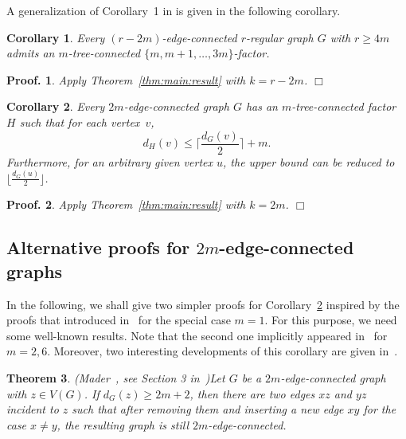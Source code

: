 \documentclass[10pt,bezier]{article}
\newtheorem{prethm}{{\bf Theorem}}[section]
\newenvironment{thm}{\begin{prethm}{\hspace{-0.5
em}{\bf.}}}{\end{prethm}}
\newtheorem{precor}[prethm]{{\bf Corollary}}
\newenvironment{cor}{\begin{precor}{\hspace{-0.5
em}{\bf.}}}{\end{precor}}
\newtheorem{preproof}{{\bf Proof.}}
\newenvironment{proof}[1]{\begin{preproof}{\rm
#1}\hfill{$\Box$}}{\end{preproof}}
\begin{document}
%
A generalization of Corollary~1 in \cite{SpanningTreeEulerian-2015} is given in the following corollary.
\begin{cor}
{ Every $(r-2m)$-edge-connected $r$-regular graph $G$ with $r\ge 4m$
 admits an $m$-tree-connected $\{m,m+1,\ldots,3m\}$-factor.
}\end{cor}
\begin{proof}
{Apply Theorem~\ref{thm:main:result} with $k=r-2m$.
}\end{proof}
%
\begin{cor}\label{cor:New}
{Every $2m$-edge-connected graph $G$ has an $m$-tree-connected factor $H$ 
such that for each vertex~$v$, 
$$d_H(v)\le \big\lceil \frac{d_G(v)}{2}\big\rceil+m.$$
Furthermore, for an arbitrary given vertex $u$, the upper bound can be reduced to $\lfloor \frac{d_G(u)}{2}\rfloor$.
}\end{cor}
%
\begin{proof}
{Apply Theorem~\ref{thm:main:result} with $k=2m$.
}\end{proof}
%
%
\subsection{Alternative proofs for $2m$-edge-connected graphs}
%
%
In the following, we shall give two simpler proofs for Corollary~\ref{cor:New} inspired by the proofs that introduced in~\cite{BangJensen-Thomasse-Yeo-2003, MR1621287, Thomassen-2008-P3} for the special case $m=1$.
For this purpose, we need some well-known results.
Note that the second one implicitly appeared in~\cite{Bensmail-Harutyunyan-Le-Thomasse-2019} for $m=2,6$.
Moreover, two interesting developments of this corollary are given in~\cite{AHO}.
%
\begin{thm}{\rm (Mader~\cite{Mader-1978}, see Section 3 in~\cite{Ok-Thomassen-2017})}\label{thm:Mader}
{Let $G$ be a $2m$-edge-connected graph with $z\in V(G)$.
If $d_G(z)\ge 2m+2$, then 
 there are two edges $xz$ and $yz$ incident to $z$ such that after removing them and inserting a new edge $xy$ for the case $x\neq y$, 
the resulting graph is still $2m$-edge-connected.
}\end{thm}
\end{document}
